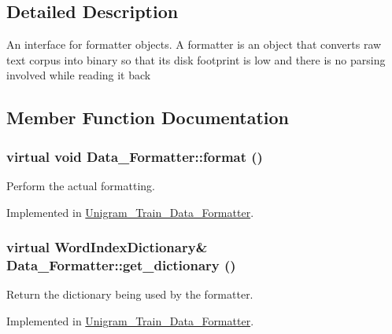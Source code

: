 \subsection{Detailed Description}
An interface for formatter objects. A formatter is an object that converts raw text corpus into binary so that its disk footprint is low and there is no parsing involved while reading it back 

\subsection{Member Function Documentation}
\hypertarget{class_data___formatter_a4180972aaff1249e0290c3544665403d}{
\subsubsection[{format}]{\setlength{\rightskip}{0pt plus 5cm}virtual void Data\_\-Formatter::format ()}}
\label{class_data___formatter_a4180972aaff1249e0290c3544665403d}


Perform the actual formatting. 



Implemented in \hyperlink{class_unigram___train___data___formatter_a36638dccaf14cf8ab597a3f8f0694cfe}{Unigram\_\-Train\_\-Data\_\-Formatter}.

\hypertarget{class_data___formatter_ad7371376f95eddd15fb197a729b28c50}{
\subsubsection[{get\_\-dictionary}]{\setlength{\rightskip}{0pt plus 5cm}virtual {\bf WordIndexDictionary}\& Data\_\-Formatter::get\_\-dictionary ()}}
\label{class_data___formatter_ad7371376f95eddd15fb197a729b28c50}


Return the dictionary being used by the formatter. 



Implemented in \hyperlink{class_unigram___train___data___formatter_ab406933ef119074cab682cb07c9078b4}{Unigram\_\-Train\_\-Data\_\-Formatter}.

